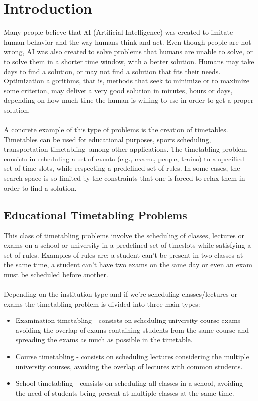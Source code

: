 \setcounter{secnumdepth}{2}
\chapter{Introduction}
\label{introduction}
\thispagestyle{plain}

Many people believe that AI (Artificial Intelligence) was created to imitate human behavior and the way humans think and act. Even though people are not wrong, AI was also created to solve problems that humans are unable to solve, or to solve them in a shorter time window, with a better solution. Humans may take days to find a solution, or may not find a solution that fits their needs. Optimization algorithms, that is, methods that seek to minimize or to maximize some criterion, may deliver a very good solution in minutes, hours or days, depending on how much time the human is willing to use in order to get a proper solution.\\
\\
A concrete example of this type of problems is the creation of timetables. Timetables can be used for educational purposes, sports scheduling, transportation timetabling, among other applications. The timetabling problem consists in scheduling a set of events (e.g., exams, people, trains) to a specified set of time slots, while respecting a predefined set of rules. In some cases, the search space is so limited by the constraints that one is forced to relax them in order to find a solution. 


\section{Educational Timetabling Problems}

This class of timetabling problems involve the scheduling of classes, lectures or exams on a school or university in a predefined set of timeslots while satisfying a set of rules. Examples of rules are: a student can't be present in two classes at the same time, a student can't have two exams on the same day or even an exam must be scheduled before another.\\
\\
Depending on the institution type and if we're scheduling classes/lectures or exams the timetabling problem is divided into three main types:

\begin{itemize}
	\item Examination timetabling - consists on scheduling university course exams avoiding the overlap of exams containing students from the same course and spreading the exams as much as possible in the timetable.
	\item Course timetabling - consists on scheduling lectures considering the multiple university courses, avoiding the overlap of lectures with common students.
	\item School timetabling - consists on scheduling all classes in a school, avoiding the need of students being present at multiple classes at the same time.
\end{itemize}

